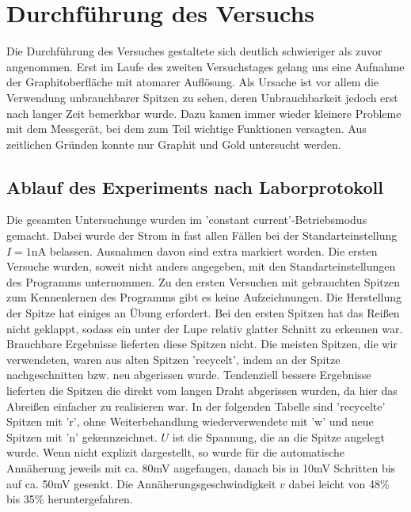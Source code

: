 \section{Durchführung des Versuchs}

Die Durchführung des Versuches gestaltete sich deutlich schwieriger als zuvor angenommen. 
Erst im Laufe des zweiten Versuchstages gelang uns eine Aufnahme der Graphitoberfläche mit 
atomarer Auflösung. Als Ursache ist vor allem die Verwendung unbrauchbarer Spitzen zu sehen, 
deren Unbrauchbarkeit jedoch erst nach langer Zeit bemerkbar wurde. Dazu kamen immer wieder 
kleinere Probleme mit dem Messgerät, bei dem zum Teil wichtige Funktionen versagten. Aus 
zeitlichen Gründen konnte nur Graphit und Gold untersucht werden.  

\subsection{Ablauf des Experiments nach Laborprotokoll}
Die gesamten Untersuchunge wurden im 'constant current'-Betriebsmodus gemacht. Dabei wurde 
der Strom in fast allen Fällen bei der Standarteinstellung $I = 1\mathrm{nA}$ belassen. 
Ausnahmen davon sind extra markiert worden. 
Die ersten Versuche wurden, soweit nicht anders angegeben,  mit den Standarteinstellungen 
des Programms unternommen. Zu den ersten Versuchen mit gebrauchten Spitzen zum Kennenlernen 
des Programms gibt es keine Aufzeichnungen.
Die Herstellung der Spitze hat einiges an Übung erfordert. Bei den ersten Spitzen hat das 
Reißen nicht geklappt, sodass ein unter der Lupe relativ glatter Schnitt zu erkennen war. 
Brauchbare Ergebnisse lieferten diese Spitzen nicht. Die meisten Spitzen, die wir verwendeten, 
waren aus alten Spitzen 'recycelt', indem an der Spitze nachgeschnitten bzw. neu abgerissen 
wurde. Tendenziell bessere Ergebnisse lieferten die Spitzen die direkt vom langen Draht 
abgerissen wurden, da hier das Abreißen einfacher zu realisieren war. In der folgenden Tabelle 
sind 'recycelte' Spitzen mit 'r', ohne Weiterbehandlung wiederverwendete mit 
'w' und neue Spitzen mit 'n' gekennzeichnet. $U$ ist die Spannung, die an die Spitze angelegt 
wurde. Wenn nicht explizit dargestellt, so wurde für die automatische Annäherung 
jeweils mit ca. 80mV angefangen, danach bis 
in 10mV Schritten bis auf ca. 50mV gesenkt. Die Annäherungsgeschwindigkeit $v$ dabei leicht 
von 48\% bis 35\% heruntergefahren. 


